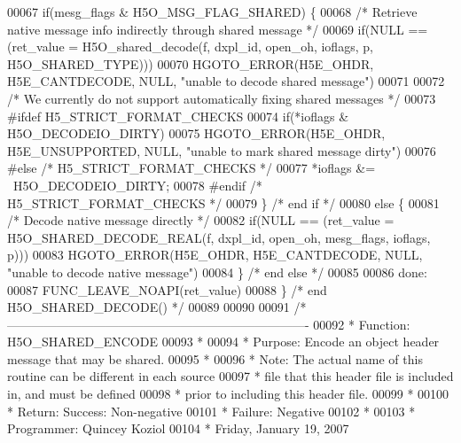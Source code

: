 \begin{DoxyCode}
00067     \textcolor{keywordflow}{if}(mesg\_flags & H5O\_MSG\_FLAG\_SHARED) \{
00068         \textcolor{comment}{/* Retrieve native message info indirectly through shared message */}
00069         \textcolor{keywordflow}{if}(NULL == (ret\_value = H5O\_shared\_decode(f, dxpl\_id, open\_oh, ioflags, p, H5O\_SHARED\_TYPE)))
00070         HGOTO\_ERROR(H5E\_OHDR, H5E\_CANTDECODE, NULL, \textcolor{stringliteral}{"unable to decode shared message"})
00071 
00072         \textcolor{comment}{/* We currently do not support automatically fixing shared messages */}
00073 \textcolor{preprocessor}{#ifdef H5\_STRICT\_FORMAT\_CHECKS}
00074         \textcolor{keywordflow}{if}(*ioflags & H5O\_DECODEIO\_DIRTY)
00075             HGOTO\_ERROR(H5E\_OHDR, H5E\_UNSUPPORTED, NULL, \textcolor{stringliteral}{"unable to mark shared message dirty"})
00076 \textcolor{preprocessor}{#else }\textcolor{comment}{/* H5\_STRICT\_FORMAT\_CHECKS */}\textcolor{preprocessor}{}
00077         *ioflags &= ~H5O\_DECODEIO\_DIRTY;
00078 \textcolor{preprocessor}{#endif }\textcolor{comment}{/* H5\_STRICT\_FORMAT\_CHECKS */}\textcolor{preprocessor}{}
00079     \} \textcolor{comment}{/* end if */}
00080     \textcolor{keywordflow}{else} \{
00081         \textcolor{comment}{/* Decode native message directly */}
00082         \textcolor{keywordflow}{if}(NULL == (ret\_value = H5O\_SHARED\_DECODE\_REAL(f, dxpl\_id, open\_oh, mesg\_flags, ioflags, p)))
00083         HGOTO\_ERROR(H5E\_OHDR, H5E\_CANTDECODE, NULL, \textcolor{stringliteral}{"unable to decode native message"})
00084     \} \textcolor{comment}{/* end else */}
00085 
00086 done:
00087     FUNC\_LEAVE\_NOAPI(ret\_value)
00088 \} \textcolor{comment}{/* end H5O\_SHARED\_DECODE() */}
00089 
00090 
00091 \textcolor{comment}{/*-------------------------------------------------------------------------}
00092 \textcolor{comment}{ * Function:    H5O\_SHARED\_ENCODE}
00093 \textcolor{comment}{ *}
00094 \textcolor{comment}{ * Purpose:     Encode an object header message that may be shared.}
00095 \textcolor{comment}{ *}
00096 \textcolor{comment}{ * Note:    The actual name of this routine can be different in each source}
00097 \textcolor{comment}{ *      file that this header file is included in, and must be defined}
00098 \textcolor{comment}{ *      prior to including this header file.}
00099 \textcolor{comment}{ *}
00100 \textcolor{comment}{ * Return:      Success:        Non-negative}
00101 \textcolor{comment}{ *              Failure:        Negative}
00102 \textcolor{comment}{ *}
00103 \textcolor{comment}{ * Programmer:  Quincey Koziol}
00104 \textcolor{comment}{ *              Friday, January 19, 2007}

\end{DoxyCode}
